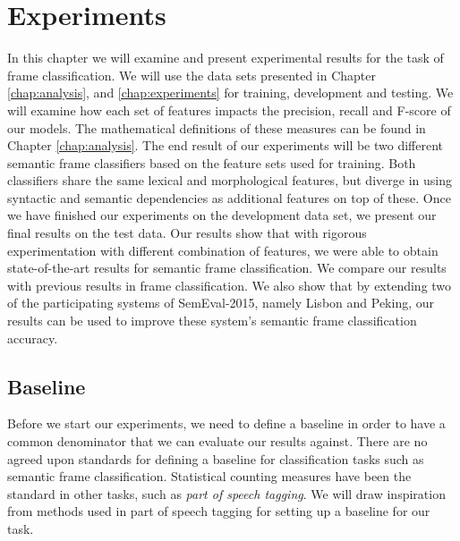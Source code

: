 \chapter{Experiments}
\label{chap:results}


In this chapter we will examine and present experimental results for the task of frame classification. We will use the data sets presented in Chapter \ref{chap:analysis}, and \ref{chap:experiments} for training, development and testing. We will examine how each set of features impacts the precision, recall and F-score of our models. The mathematical definitions of these measures can be found in Chapter \ref{chap:analysis}. The end result of our experiments will be two different semantic frame classifiers based on the feature sets used for training. Both classifiers share the same lexical and morphological features, but diverge in using syntactic and semantic dependencies as additional features on top of these. Once we have finished our experiments on the development data set, we present our final results on the test data. Our results show that with rigorous experimentation with different combination of features, we were able to obtain state-of-the-art results for semantic frame classification. We compare our results with previous results in frame classification. We also show that by extending two of the participating systems of SemEval-2015, namely Lisbon and Peking, our results can be used to improve these system's semantic frame classification accuracy.


\section{Baseline}

Before we start our experiments, we need to define a baseline in order to have a common denominator that we can evaluate our results against. There are no agreed upon standards for defining a baseline for classification tasks such as semantic frame classification. Statistical counting measures have been the standard in other tasks, such as \textit{part of speech tagging}. We will draw inspiration from methods used in part of speech tagging for setting up a baseline for our task.

